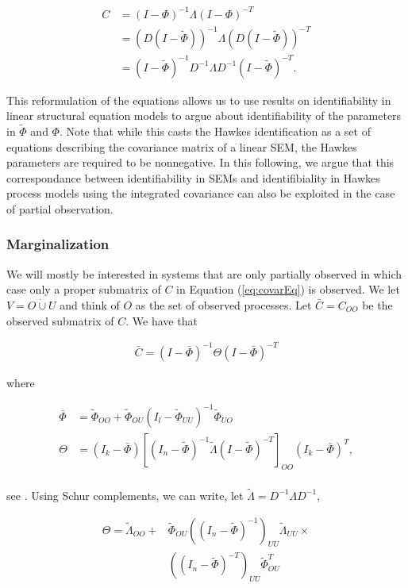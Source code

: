 \documentclass[accepted]{uai2021} %
\newcommand{\disjU}{\mathbin{\dot{\cup}}}
\begin{document}
\begin{align*}
C & = (I - \Phi)^{-1}\Lambda (I - \Phi)^{-T}  \\
& = (D(I - \tilde{\Phi}))^{-1}\Lambda (D(I - \tilde{\Phi}))^{-T} \\
& = (I - \tilde{\Phi})^{-1}D^{-1} \Lambda D^{-1}(I - 
\tilde{\Phi})^{-T}.
\label{eq:Gtilde}
\end{align*}


This reformulation of the equations allows us to use results on identifiability 
in linear structural 
equation models to argue about 
identifiability of the parameters in $\tilde{\Phi}$ and $\Phi$. Note that while 
this 
casts the Hawkes identification as a set of equations describing the covariance 
matrix of a linear SEM, the Hawkes parameters are required to be nonnegative. 
In this 
following, we argue that this correspondance between 
identifiability in SEMs and identifibiality in Hawkes process models using the 
integrated covariance can also be exploited in the case of partial observation.


\subsubsection{Marginalization}
\label{sssec:marg}

We will mostly be interested in systems that are only partially observed in 
which case only a proper submatrix of $C$ in Equation (\ref{eq:covarEq}) is 
observed. We let $V = O \disjU 
U$ and think of $O$ as the set of observed processes. Let $\bar{C} = C_{OO}$ be 
the observed submatrix of $C$. We 
have 
that 

\begin{align}
\bar{C} = (I - \bar{\Phi})^{-1}\Theta(I - \bar{\Phi})^{-T}
\end{align}

where 

\begin{align*}
\bar{\Phi} & = \tilde{\Phi}_{OO} +  \tilde{\Phi}_{OU}(I_l - 
\tilde{\Phi}_{UU})^{-1}\tilde{\Phi}_{UO} \\
\Theta & = (I_k-\bar{\Phi})[(I_n - \tilde{\Phi})^{-1}\tilde{\Lambda}(I - 
\tilde{\Phi})^{-T}]_{OO}(I_k-\bar{\Phi})^T, \\
\end{align*}

see \cite{hyttinen2012}. Using Schur complements, we can write, let 
$\tilde{\Lambda} 
= D^{-1}\Lambda D^{-1}$,

\begin{align*}
	\Theta =  \tilde{\Lambda}_{OO} + & \tilde{\Phi}_{OU}((I_n - 
	\tilde{\Phi})^{-1})_{UU}\tilde{\Lambda}_{UU} \times  \\ & ((I_n - 
	\tilde{\Phi})^{-T})_{UU}
	\tilde{\Phi}_{OU}^T
\end{align*}
\end{document}
